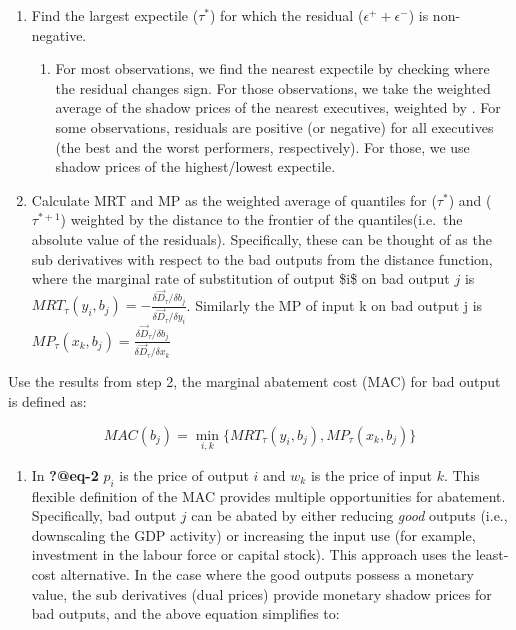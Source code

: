 \documentclass[
  letterpaper,
  DIV=11,
  numbers=noendperiod]{scrartcl}
\providecommand{\tightlist}{%
  \setlength{\itemsep}{0pt}\setlength{\parskip}{0pt}}
\begin{document}
\begin{enumerate}
\def\labelenumi{\arabic{enumi}.}
\tightlist
\item
  Find the largest expectile (\(\tau^{*}\)) for which the residual
  (\(\epsilon^+ + \epsilon^-\)) is non-negative.

  \begin{enumerate}
  \def\labelenumii{\roman{enumii}.}
  \tightlist
  \item
    For most observations, we find the nearest expectile by checking
    where the residual changes sign. For those observations, we take the
    weighted average of the shadow prices of the nearest executives,
    weighted by . For some observations, residuals are positive (or
    negative) for all executives (the best and the worst performers,
    respectively). For those, we use shadow prices of the highest/lowest
    expectile.
  \end{enumerate}
\item
  Calculate MRT and MP as the weighted average of quantiles for
  (\(\tau^{*}\)) and (\(\tau^{*+1}\)) weighted by the distance to the
  frontier of the quantiles(i.e.~the absolute value of the residuals).
  Specifically, these can be thought of as the sub derivatives with
  respect to the bad outputs from the distance function, where the
  marginal rate of substitution of output \$i\$ on bad output \(j\) is
  \(MRT_{\tau}(y_{i},b_{j})=-\frac{\delta \vec{D}_{\tau}/\delta b_{j}}{\delta \vec{D}_{\tau}/\delta y_{i}}\).
  Similarly the MP of input k on bad output j is
  \(MP_{\tau}(x_{k},b_{j})=\frac{\delta \vec{D}_{\tau}/\delta b_{j}}{\delta \vec{D}_{\tau}/\delta x_{k}}\)
\end{enumerate}

Use the results from step 2, the marginal abatement cost (MAC) for bad
output is defined as:

\begin{equation}
MAC(b_{j})=\displaystyle \min_{i,k}\{MRT_{\tau}(y_{i},b_{j}), MP_{\tau}(x_{k},b_{j})\} 
\end{equation}

\begin{enumerate}
\def\labelenumi{\roman{enumi}.}
\tightlist
\item
  In \textbf{?@eq-2} \(p_{i}\) is the price of output \(i\) and
  \(w_{k}\) is the price of input \(k\). This flexible definition of the
  MAC provides multiple opportunities for abatement. Specifically, bad
  output \(j\) can be abated by either reducing \emph{good} outputs
  (i.e., downscaling the GDP activity) or increasing the input use (for
  example, investment in the labour force or capital stock). This
  approach uses the least-cost alternative. In the case where the good
  outputs possess a monetary value, the sub derivatives (dual prices)
  provide monetary shadow prices for bad outputs, and the above equation
  simplifies to:
\end{enumerate}
\end{document}
